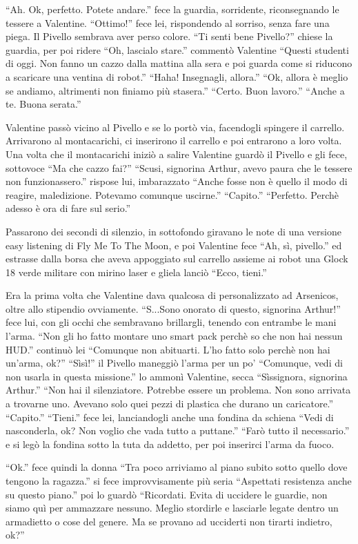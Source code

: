     ``Ah. Ok, perfetto. Potete andare.'' fece la guardia, sorridente, riconsegnando le tessere a Valentine. ``Ottimo!''
    fece lei, rispondendo al sorriso, senza fare una piega. Il Pivello sembrava aver perso colore. ``Ti senti bene
    Pivello?'' chiese la guardia, per poi ridere ``Oh, lascialo stare.'' commentò Valentine ``Questi studenti di oggi.
    Non fanno un cazzo dalla mattina alla sera e poi guarda come si riducono a scaricare una ventina di robot.'' ``Haha!
    Insegnagli, allora.'' ``Ok, allora è meglio se andiamo, altrimenti non finiamo più stasera.'' ``Certo. Buon
    lavoro.'' ``Anche a te. Buona serata.''

    Valentine passò vicino al Pivello e se lo portò via, facendogli spingere il carrello. Arrivarono al montacarichi, ci
    inserirono il carrello e poi entrarono a loro volta. Una volta che il montacarichi iniziò a salire Valentine guardò
    il Pivello e gli fece, sottovoce ``Ma che cazzo fai?'' ``Scusi, signorina Arthur, avevo paura che le tessere non
    funzionassero.'' rispose lui, imbarazzato ``Anche fosse non è quello il modo di reagire, maledizione. Potevamo
    comunque uscirne.'' ``Capito.'' ``Perfetto. Perchè adesso è ora di fare sul serio.''

    Passarono dei secondi di silenzio, in sottofondo giravano le note di una versione easy listening di Fly Me To The
    Moon, e poi Valentine fece ``Ah, sì, pivello.'' ed estrasse dalla borsa che aveva appoggiato sul carrello assieme ai
    robot una Glock 18 verde militare con mirino laser e gliela lanciò ``Ecco, tieni.''

    Era la prima volta che Valentine dava qualcosa di personalizzato ad Arsenicos, oltre allo stipendio ovviamente.
    ``S...Sono onorato di questo, signorina Arthur!'' fece lui, con gli occhi che sembravano brillargli, tenendo con
    entrambe le mani l'arma. ``Non gli ho fatto montare uno smart pack perchè so che non hai nessun HUD.'' continuò lei
    ``Comunque non abituarti. L'ho fatto solo perchè non hai un'arma, ok?'' ``Sìsì!'' il Pivello maneggiò l'arma per un
    po' ``Comunque, vedi di non usarla in questa missione.'' lo ammonì Valentine, secca ``Sìssignora, signorina
    Arthur.'' ``Non hai il silenziatore. Potrebbe essere un problema. Non sono arrivata a trovarne uno. Avevano solo
    quei pezzi di plastica che durano un caricatore.'' ``Capito.'' ``Tieni.'' fece lei, lanciandogli anche una fondina
    da schiena ``Vedi di nasconderla, ok? Non voglio che vada tutto a puttane.'' ``Farò tutto il necessario.'' e si legò
    la fondina sotto la tuta da addetto, per poi inserirci l'arma da fuoco.

    ``Ok.'' fece quindi la donna ``Tra poco arriviamo al piano subito sotto quello dove tengono la ragazza.'' si fece
    improvvisamente più seria ``Aspettati resistenza anche su questo piano.'' poi lo guardò ``Ricordati. Evita di
    uccidere le guardie, non siamo quì per ammazzare nessuno. Meglio stordirle e lasciarle legate dentro un armadietto o
    cose del genere. Ma se provano ad ucciderti non tirarti indietro, ok?''
